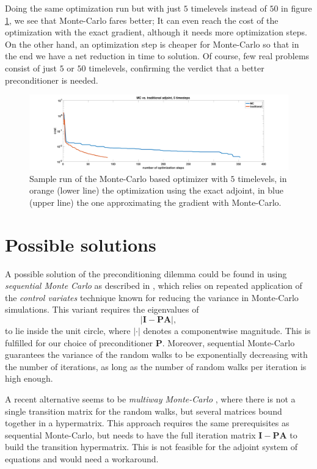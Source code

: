 \documentclass[twoside]{IEEEtran}
\renewcommand*{\vec}[1]{\ensuremath{{\bm{#1}}}}
\newcommand*{\mat}[1]{\vec{#1}}
\begin{document}
Doing the same optimization run but with just $5$ timelevels instead of $50$ in figure \ref{sampleRun5}, we see that Monte-Carlo fares better; It can even reach the cost of the optimization with the exact gradient, although it needs more optimization steps.
On the other hand, an optimization step is cheaper for Monte-Carlo so that in the end we have a net reduction in time to solution.
Of course, few real problems consist of just $5$ or $50$ timelevels, confirming the verdict that a better preconditioner is needed.

\begin{figure}
	\centering
	\includegraphics[width=\linewidth]{mctrad5}
	\caption{Sample run of the Monte-Carlo based optimizer with $5$ timelevels, in orange (lower line) the optimization using the exact adjoint, in blue (upper line) the one approximating the gradient with Monte-Carlo.}
	\label{sampleRun5}
\end{figure} 
\newpage
\section{Possible solutions}
\label{possibleSolutions}
A possible solution of the preconditioning dilemma could be found in using \emph{sequential Monte Carlo}
as described in \cite{sequential}, which relies on repeated application of the \emph{control variates} technique \cite{handbook} known for reducing the variance in Monte-Carlo simulations. This variant requires the eigenvalues of 
\begin{equation}
\lvert \mat{I} - \mat{PA} \rvert,
\end{equation}
to lie inside the unit circle, where $\lvert \cdot \rvert$ denotes a componentwise magnitude.
This is fulfilled for our choice of preconditioner $\mat{P}$.
Moreover, sequential Monte-Carlo guarantees the variance of the random walks to be exponentially decreasing with the number of iterations, as long as the number of random walks per iteration is high enough.

A recent alternative seems to be \emph{multiway Monte-Carlo} \cite{multiway}, where there is not a single transition matrix for the random walks, but several matrices bound together in a hypermatrix.
This approach requires the same prerequisites as sequential Monte-Carlo, but needs to have the full iteration matrix $\mat{I} - \mat{PA}$ to build the transition hypermatrix.
This is not feasible for the adjoint system of equations and would need a workaround.
\end{document}
